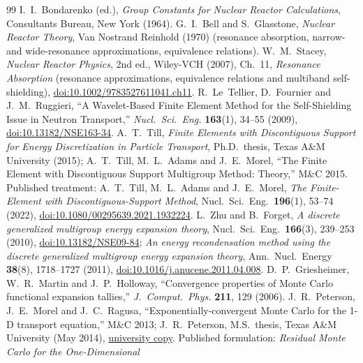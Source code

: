 \documentclass[11pt]{article}
\begin{document}
\begin{thebibliography}{99}
 I.~I.~Bondarenko (ed.), \emph{Group Constants for Nuclear Reactor
  Calculations}, Consultants Bureau, New York (1964).
 G.~I.~Bell and S.~Glasstone, \emph{Nuclear Reactor Theory}, Van
  Nostrand Reinhold (1970) (resonance absorption, narrow- and wide-resonance
  approximations, equivalence relations).
 W.~M.~Stacey, \emph{Nuclear Reactor Physics}, 2nd ed., Wiley-VCH
  (2007), Ch.~11, \emph{Resonance Absorption} (resonance approximations,
  equivalence relations and multiband self-shielding),
  \href{https://doi.org/10.1002/9783527611041.ch11}{doi:10.1002/9783527611041.ch11}.
 R.~Le~Tellier, D.~Fournier and J.~M.~Ruggieri, ``A Wavelet-Based
  Finite Element Method for the Self-Shielding Issue in Neutron Transport,''
  \emph{Nucl.\ Sci.\ Eng.} \textbf{163}(1), 34--55 (2009),
  \href{https://doi.org/10.13182/NSE163-34}{doi:10.13182/NSE163-34}.
 A.~T.~Till, \emph{Finite Elements with Discontiguous Support for Energy
  Discretization in Particle Transport}, Ph.D.\ thesis, Texas A\&M University (2015);
  A.~T.~Till, M.~L.~Adams and J.~E.~Morel, ``The Finite Element with Discontiguous
  Support Multigroup Method: Theory,'' M\&C 2015.
  Published treatment: A.~T.~Till, M.~L.~Adams and J.~E.~Morel,
  \emph{The Finite-Element with Discontiguous-Support Method},
  Nucl.\ Sci.\ Eng.\ \textbf{196}(1), 53--74 (2022),
  \href{https://doi.org/10.1080/00295639.2021.1932224}{doi:10.1080/00295639.2021.1932224}.
 L.~Zhu and B.~Forget,
  \emph{A discrete generalized multigroup energy expansion theory},
  Nucl.\ Sci.\ Eng.\ \textbf{166}(3), 239--253 (2010),
  \href{https://doi.org/10.13182/NSE09-84}{doi:10.13182/NSE09-84};
  \emph{An energy recondensation method using the discrete generalized multigroup
  energy expansion theory}, Ann.\ Nucl.\ Energy \textbf{38}(8), 1718--1727 (2011),
  \href{https://doi.org/10.1016/j.anucene.2011.04.008}{doi:10.1016/j.anucene.2011.04.008}.
 D.~P.~Griesheimer, W.~R.~Martin and J.~P.~Holloway,
  ``Convergence properties of Monte Carlo functional expansion tallies,''
  \emph{J.\ Comput.\ Phys.} \textbf{211}, 129 (2006).
 J.~R.~Peterson, J.~E.~Morel and J.~C.~Ragusa,
  ``Exponentially-convergent Monte Carlo for the 1-D transport equation,'' M\&C 2013;
  J.~R.~Peterson, M.S.\ thesis, Texas A\&M University (May 2014),
  \href{https://oaktrust.library.tamu.edu/bitstreams/69ab2dae-3fef-4daf-96d0-2bd1896d81e3/download}
  {university copy}.
  Published formulation: \emph{Residual Monte Carlo for the One-Dimensional
}
\end{thebibliography}
\end{document}
